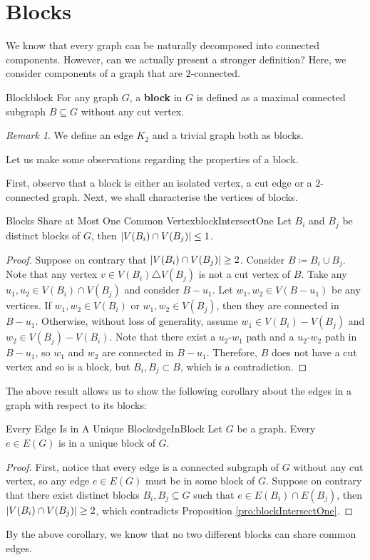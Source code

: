 \documentclass[math]{amznotes}
\theoremstyle{remark}
\newtheorem*{remark}{Remark}
\begin{document}
\section{Blocks}
We know that every graph can be naturally decomposed into connected components. However, can we actually present a stronger definition? Here, we consider components of a graph that are $2$-connected.
\begin{dfnbox}{Block}{block}
    For any graph $G$, a {\color{red} \textbf{block}} in $G$ is defined as a maximal connected subgraph $B \subseteq G$ without any cut vertex.
\end{dfnbox}
\begin{notebox}
    \begin{remark}
        We define an edge $K_2$ and a trivial graph both as blocks.
    \end{remark}
\end{notebox}
Let us make some observations regarding the properties of a block.

First, observe that a block is either an isolated vertex, a cut edge or a $2$-connected graph. Next, we shall characterise the vertices of blocks.
\begin{probox}{Blocks Share at Most One Common Vertex}{blockIntersectOne}
    Let $B_i$ and $B_j$ be distinct blocks of $G$, then ${\left\lvert {V(B_i) \cap V(B_j)} \right\rvert} \leq 1$.
    \tcblower
    \begin{proof}
        Suppose on contrary that ${\left\lvert {V(B_i) \cap V(B_j)} \right\rvert} \geq 2$. Consider $B \coloneqq B_i \cup B_j$. Note that any vertex $v \in V(B_i) \triangle V(B_j)$ is not a cut vertex of $B$. Take any $u_1, u_2 \in V(B_i) \cap V(B_j)$ and consider $B - u_1$. Let $w_1, w_2 \in V(B - u_1)$ be any vertices. If $w_1, w_2 \in V(B_i)$ or $w_1, w_2 \in V(B_j)$, then they are connected in $B - u_1$. Otherwise, without loss of generality, assume $w_1 \in V(B_i) - V(B_j)$ and $w_2 \in V(B_j) - V(B_i)$. Note that there exist a $u_2$-$w_1$ path and a $u_2$-$w_2$ path in $B - u_1$, so $w_1$ and $w_2$ are connected in $B - u_1$. Therefore, $B$ does not have a cut vertex and so is a block, but $B_i, B_j \subset B$, which is a contradiction.
    \end{proof}
\end{probox}
The above result allows us to show the following corollary about the edges in a graph with respect to its blocks:
\begin{corbox}{Every Edge Is in A Unique Block}{edgeInBlock}
    Let $G$ be a graph. Every $e \in E(G)$ is in a unique block of $G$.
    \tcblower
    \begin{proof}
        First, notice that every edge is a connected subgraph of $G$ without any cut vertex, so any edge $e \in E(G)$ must be in some block of $G$. Suppose on contrary that there exist distinct blocks $B_i, B_j \subseteq G$ such that $e \in E(B_i) \cap E(B_j)$, then ${\left\lvert {V(B_i) \cap V(B_j)} \right\rvert} \geq 2$, which contradicts Proposition \ref{pro:blockIntersectOne}.
    \end{proof}
\end{corbox}
By the above corollary, we know that no two different blocks can share common edges.
\end{document}
